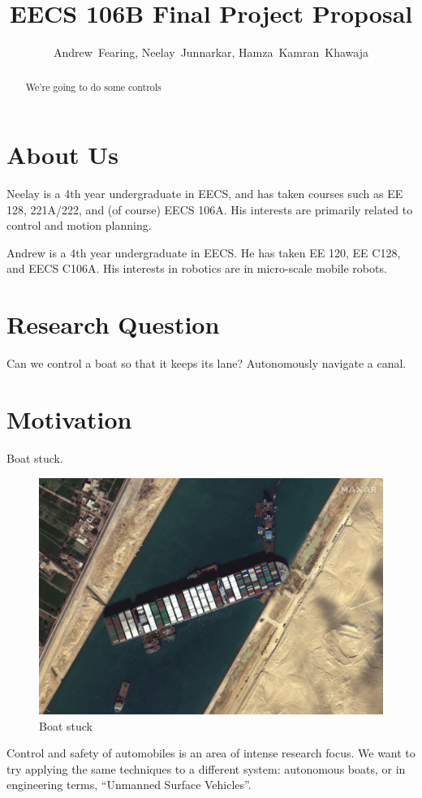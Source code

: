\documentclass[conference]{IEEEtran}
\begin{document}
\title{EECS 106B Final Project Proposal}
\author{Andrew~Fearing, Neelay~Junnarkar,  Hamza~Kamran~Khawaja}
\maketitle


\begin{abstract}
We're going to do some controls
\end{abstract}


\section{About Us}
Neelay is a 4th year undergraduate in EECS, and has taken courses such as EE 128, 221A/222, and (of course) EECS 106A. His interests are primarily related to control and motion planning.

Andrew is a 4th year undergraduate in EECS. He has taken EE 120, EE C128, and EECS C106A. His interests in robotics are in micro-scale mobile robots.
\section{Research Question}
Can we control a boat so that it keeps its lane? Autonomously navigate a canal.
\section{Motivation}
Boat stuck.
\begin{figure}
    \centering
    \includegraphics{documents/proposal/Suez_Canal_blocked_by_Ever_Given_March_27_2021.jpg}
    \caption{Boat stuck\label{fig:boat_stuck}}
\end{figure}
Control and safety of automobiles is an area of intense research focus. We want to try applying the same techniques to a different system: autonomous boats, or in engineering terms, \enquote{Unmanned Surface Vehicles}.
\end{document}

